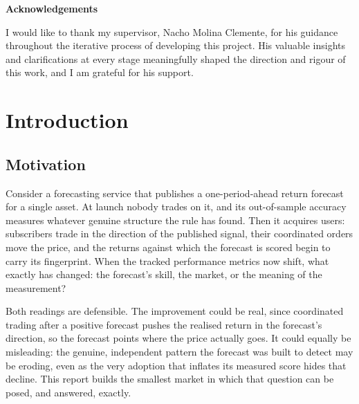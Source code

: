 \documentclass[12pt]{article}
\begin{document}
\begin{center}{\Large\bfseries\color{accent} Acknowledgements\par}\end{center}
\vspace{0.8em}
\begin{center}
\begin{minipage}{0.9\textwidth}
\justifying
\noindent I would like to thank my supervisor, Nacho Molina Clemente, for his guidance throughout the iterative process of developing this project. His valuable insights and clarifications at every stage meaningfully shaped the direction and rigour of this work, and I am grateful for his support.
\end{minipage}
\end{center}
\clearpage

\setcounter{tocdepth}{1}
\tableofcontents
\newpage


\section{Introduction}

\subsection{Motivation}

Consider a forecasting service that publishes a one-period-ahead return forecast for a single asset. At launch nobody trades on it, and its out-of-sample accuracy measures whatever genuine structure the rule has found. Then it acquires users: subscribers trade in the direction of the published signal, their coordinated orders move the price, and the returns against which the forecast is scored begin to carry its fingerprint. When the tracked performance metrics now shift, what exactly has changed: the forecast's skill, the market, or the meaning of the measurement? %

Both readings are defensible. The improvement could be real, since coordinated trading after a positive forecast pushes the realised return in the forecast's direction, so the forecast points where the price actually goes. It could equally be misleading: the genuine, independent pattern the forecast was built to detect may be eroding, even as the very adoption that inflates its measured score hides that decline. This report builds the smallest market in which that question can be posed, and answered, exactly. %
\end{document}
